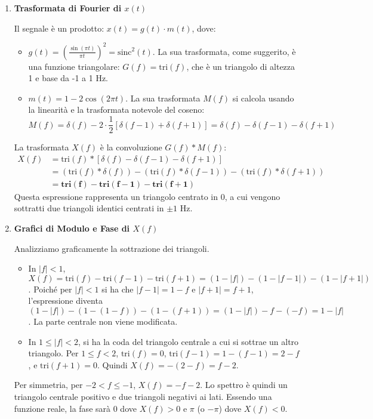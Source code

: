 
\begin{soluzione}{24}
    \begin{enumerate}
        \item \textbf{Trasformata di Fourier di $x(t)$}
        
        Il segnale è un prodotto: $x(t) = g(t) \cdot m(t)$, dove:
        \begin{itemize}
            \item $g(t) = \left( \frac{\sin(\pi t)}{\pi t} \right)^2 = \text{sinc}^2(t)$. La sua trasformata, come suggerito, è una funzione triangolare: $G(f) = \text{tri}(f)$, che è un triangolo di altezza 1 e base da -1 a 1 Hz.
            \item $m(t) = 1 - 2\cos(2\pi t)$. La sua trasformata $M(f)$ si calcola usando la linearità e la trasformata notevole del coseno:
            \[
                M(f) = \delta(f) - 2 \cdot \frac{1}{2}[\delta(f-1) + \delta(f+1)] = \delta(f) - \delta(f-1) - \delta(f+1)
            \]
        \end{itemize}
        La trasformata $X(f)$ è la convoluzione $G(f) * M(f)$:
        \begin{align*}
            X(f) &= \text{tri}(f) * [\delta(f) - \delta(f-1) - \delta(f+1)] \\
            &= (\text{tri}(f) * \delta(f)) - (\text{tri}(f) * \delta(f-1)) - (\text{tri}(f) * \delta(f+1)) \\
            &= \mathbf{\text{tri}(f) - \text{tri}(f-1) - \text{tri}(f+1)}
        \end{align*}
        Questa espressione rappresenta un triangolo centrato in 0, a cui vengono sottratti due triangoli identici centrati in $\pm 1$ Hz.
        
        \item \textbf{Grafici di Modulo e Fase di $X(f)$}
        
        Analizziamo graficamente la sottrazione dei triangoli.
        \begin{itemize}
            \item In $|f| < 1$, $X(f) = \text{tri}(f) - \text{tri}(f-1) - \text{tri}(f+1) = (1-|f|) - (1-|f-1|) - (1-|f+1|)$. Poiché per $|f|<1$ si ha che $|f-1|=1-f$ e $|f+1|=f+1$, l'espressione diventa $(1-|f|) - (1-(1-f)) - (1-(f+1)) = (1-|f|) - f - (-f) = 1-|f|$. La parte centrale non viene modificata.
            \item In $1 \le |f| < 2$, si ha la coda del triangolo centrale a cui si sottrae un altro triangolo. Per $1 \le f < 2$, $\text{tri}(f)=0$, $\text{tri}(f-1)=1-(f-1)=2-f$, e $\text{tri}(f+1)=0$. Quindi $X(f) = -(2-f) = f-2$.
        \end{itemize}
        Per simmetria, per $-2 < f \le -1$, $X(f)=-f-2$.
        Lo spettro è quindi un triangolo centrale positivo e due triangoli negativi ai lati. Essendo una funzione reale, la fase sarà 0 dove $X(f)>0$ e $\pi$ (o $-\pi$) dove $X(f)<0$.
        

\end{enumerate}
\end{soluzione}
